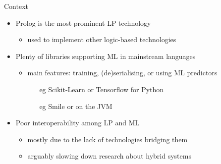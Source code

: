 \documentclass[presentation]{beamer}\mode<presentation>{\usetheme{AMSBolognaFC}}
\begin{document}
\begin{frame}[c]{Context}

    \begin{itemize}
        \item Prolog is the most prominent LP technology
        \begin{itemize}
            \item used to implement other logic-based technologies
        \end{itemize}

        \vfill

        \item Plenty of libraries supporting ML in mainstream languages
        \begin{itemize}
            \item main features: training, (de)serialising, or using ML predictors
            \begin{itemize}
                \item[eg] Scikit-Learn or Tensorflow for Python
                \item[eg] Smile or \deeplearningforj{} on the JVM
            \end{itemize}
        \end{itemize}

        \vfill

        \item Poor interoperability among LP and ML
        \begin{itemize}
            \item mostly due to the lack of technologies bridging them
            \item arguably slowing down research about hybrid systems
        \end{itemize}
    \end{itemize}
\end{frame}
\end{document}
